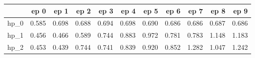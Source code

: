 \begin{tabular}{lrrrrrrrrrr}
\toprule
{} &   ep 0 &   ep 1 &   ep 2 &   ep 3 &   ep 4 &   ep 5 &   ep 6 &   ep 7 &   ep 8 &   ep 9 \\
\midrule
hp\_0 &  0.585 &  0.698 &  0.688 &  0.694 &  0.698 &  0.690 &  0.686 &  0.686 &  0.687 &  0.686 \\
hp\_1 &  0.456 &  0.466 &  0.589 &  0.744 &  0.883 &  0.972 &  0.781 &  0.783 &  1.148 &  1.183 \\
hp\_2 &  0.453 &  0.439 &  0.744 &  0.741 &  0.839 &  0.920 &  0.852 &  1.282 &  1.047 &  1.242 \\
\bottomrule
\end{tabular}
